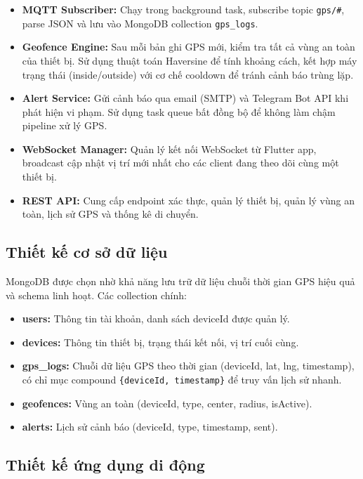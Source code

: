 \documentclass[../DoAn.tex]{subfiles}
\begin{document}
\begin{itemize}
  \item \textbf{MQTT Subscriber:} Chạy trong background task, subscribe topic \texttt{gps/\#}, parse JSON và lưu vào MongoDB collection \texttt{gps\_logs}.
  \item \textbf{Geofence Engine:} Sau mỗi bản ghi GPS mới, kiểm tra tất cả vùng an toàn của thiết bị. Sử dụng thuật toán Haversine để tính khoảng cách, kết hợp máy trạng thái (inside/outside) với cơ chế cooldown để tránh cảnh báo trùng lặp.
  \item \textbf{Alert Service:} Gửi cảnh báo qua email (SMTP) và Telegram Bot API khi phát hiện vi phạm. Sử dụng task queue bất đồng bộ để không làm chậm pipeline xử lý GPS.
  \item \textbf{WebSocket Manager:} Quản lý kết nối WebSocket từ Flutter app, broadcast cập nhật vị trí mới nhất cho các client đang theo dõi cùng một thiết bị.
  \item \textbf{REST API:} Cung cấp endpoint xác thực, quản lý thiết bị, quản lý vùng an toàn, lịch sử GPS và thống kê di chuyển.
\end{itemize}

\subsection{Thiết kế cơ sở dữ liệu}

MongoDB được chọn nhờ khả năng lưu trữ dữ liệu chuỗi thời gian GPS hiệu quả và schema linh hoạt. Các collection chính:

\begin{itemize}
  \item \textbf{users:} Thông tin tài khoản, danh sách deviceId được quản lý.
  \item \textbf{devices:} Thông tin thiết bị, trạng thái kết nối, vị trí cuối cùng.
  \item \textbf{gps\_logs:} Chuỗi dữ liệu GPS theo thời gian (deviceId, lat, lng, timestamp), có chỉ mục compound \texttt{\{deviceId, timestamp\}} để truy vấn lịch sử nhanh.
  \item \textbf{geofences:} Vùng an toàn (deviceId, type, center, radius, isActive).
  \item \textbf{alerts:} Lịch sử cảnh báo (deviceId, type, timestamp, sent).
\end{itemize}

\subsection{Thiết kế ứng dụng di động}
\end{document}
